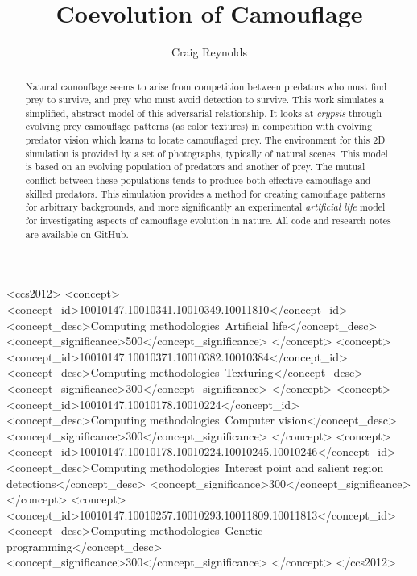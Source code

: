 \documentclass[sigconf]{acmart}
\begin{document}
\title{Coevolution of Camouflage}

\author{Craig Reynolds}

\renewcommand{\shortauthors}{Craig Reynolds}


\begin{abstract}
  Natural camouflage seems to arise from competition between predators who must find prey to survive, and prey who must avoid detection to survive. This work simulates a simplified, abstract model of this adversarial relationship. It looks at \textit{crypsis} through evolving prey camouflage patterns (as color textures) in competition with evolving predator vision which learns to locate camouflaged prey. The environment for this 2D simulation is provided by a set of photographs, typically of natural scenes. This model is based on an evolving population of predators and another of prey. The mutual conflict between these populations tends to produce both effective camouflage and skilled predators. This simulation provides a method for creating camouflage patterns for arbitrary backgrounds, and more significantly an experimental \textit{artificial life} model for investigating aspects of camouflage evolution in nature. All code and research notes are available on GitHub.
\end{abstract}


\begin{CCSXML}
<ccs2012>
   <concept>
       <concept_id>10010147.10010341.10010349.10011810</concept_id>
       <concept_desc>Computing methodologies~Artificial life</concept_desc>
       <concept_significance>500</concept_significance>
       </concept>
   <concept>
       <concept_id>10010147.10010371.10010382.10010384</concept_id>
       <concept_desc>Computing methodologies~Texturing</concept_desc>
       <concept_significance>300</concept_significance>
       </concept>
   <concept>
       <concept_id>10010147.10010178.10010224</concept_id>
       <concept_desc>Computing methodologies~Computer vision</concept_desc>
       <concept_significance>300</concept_significance>
       </concept>
    <concept>
       <concept_id>10010147.10010178.10010224.10010245.10010246</concept_id>
       <concept_desc>Computing methodologies~Interest point and salient region detections</concept_desc>
       <concept_significance>300</concept_significance>
       </concept>
    <concept>
        <concept_id>10010147.10010257.10010293.10011809.10011813</concept_id>
        <concept_desc>Computing methodologies~Genetic programming</concept_desc>
        <concept_significance>300</concept_significance>
    </concept>
 </ccs2012>
\end{CCSXML}
\end{document}

